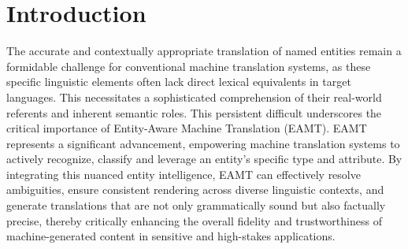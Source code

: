 \documentclass{ecai}
\begin{document}
\section{Introduction}
\label{sec:intro}
The accurate and contextually appropriate translation of named entities remain a formidable challenge
for conventional machine translation systems, as these specific linguistic elements often lack direct
lexical equivalents in target languages. This necessitates a sophisticated comprehension of their real-world
referents and inherent semantic roles. This persistent difficult underscores the critical importance of Entity-Aware
Machine Translation (EAMT). EAMT represents a significant advancement, empowering machine translation systems to actively
recognize, classify and leverage an entity's specific type and attribute. By integrating this nuanced entity intelligence, 
EAMT can effectively resolve ambiguities, ensure consistent rendering across diverse linguistic contexts, 
and generate translations that are not only grammatically sound but also factually precise, 
thereby critically enhancing the overall fidelity and trustworthiness of machine-generated content
 in sensitive and high-stakes applications.

\end{document}
